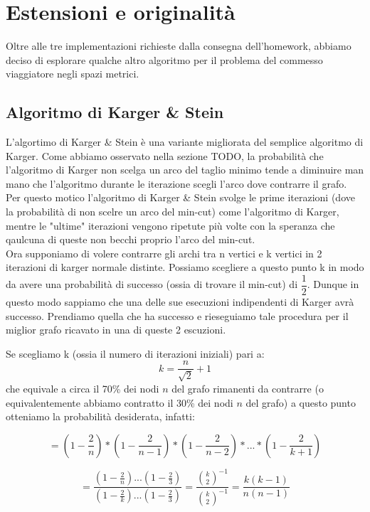 \section{Estensioni e originalità}
\label{cap:extensions-and-originalities}

\noindent Oltre alle tre implementazioni richieste dalla consegna
dell'homework, abbiamo deciso di esplorare qualche altro algoritmo per il problema del commesso viaggiatore negli spazi metrici.

\subsection{Algoritmo di Karger \& Stein}
\label{sub:karger-stein-algorithm}

L'algortimo di Karger \& Stein è una variante migliorata del semplice algoritmo di Karger. Come abbiamo osservato nella sezione TODO, la probabilità che l'algoritmo di Karger non scelga un arco del taglio minimo tende a diminuire man mano che l'algoritmo durante le iterazione scegli l'arco dove contrarre il grafo. Per questo motico l'algoritmo di Karger \& Stein svolge le prime iterazioni (dove la probabilità di non scelre un arco del min-cut) come l'algoritmo di Karger, mentre le "ultime" iterazioni vengono ripetute più volte con la speranza che qaulcuna di queste non becchi proprio l'arco del min-cut. \\

Ora supponiamo di volere contrarre gli archi tra n vertici e k vertici in 2 iterazioni di karger normale distinte. Possiamo scegliere a questo punto k in modo da avere una probabilità di successo (ossia di trovare il min-cut) di $\dfrac{1}{2}$. Dunque in questo modo sappiamo che una delle sue esecuzioni indipendenti di Karger avrà successo. Prendiamo quella che ha successo e rieseguiamo tale procedura per il miglior grafo ricavato in una di queste 2 escuzioni.

Se scegliamo k (ossia il numero di iterazioni iniziali) pari a:
$$ k = \dfrac{n}{\sqrt{2}} + 1$$
che equivale a circa il 70\% dei nodi $n$ del grafo rimanenti da contrarre (o equivalentemente abbiamo contratto il 30\% dei nodi $n$ del grafo) a questo punto otteniamo la probabilità desiderata, infatti:

$$ = (1 - \frac{2}{n}) * (1 - \frac{2}{n-1}) * (1 - \frac{2}{n-2}) * ... * (1 - \frac{2}{k+1}) $$

$$ = \dfrac{(1 - \frac{2}{n}) ... (1 - \frac{2}{3})}{(1 - \frac{2}{k}) ... (1 - \frac{2}{3})} = \dfrac{{k\choose 2}^{-1}} {{k\choose 2}^{-1}} = \dfrac{k(k-1)}{n(n-1)}$$


